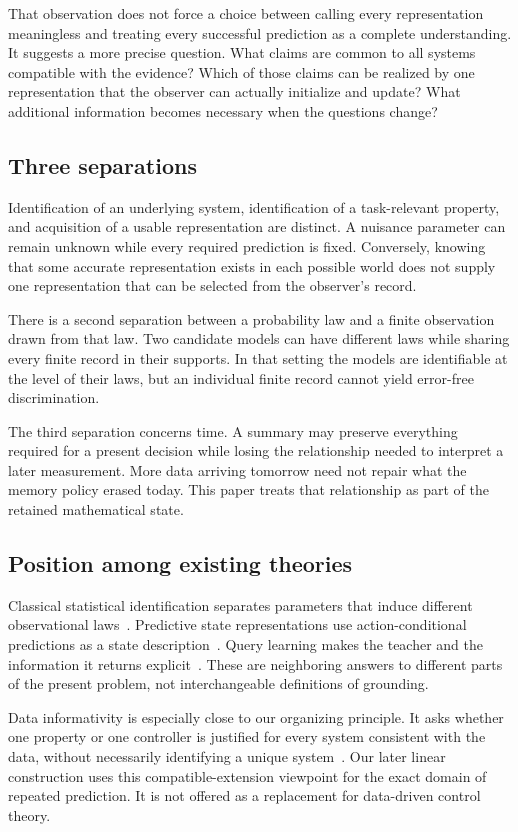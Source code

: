 \documentclass[11pt,letterpaper]{article}
\theoremstyle{plain}
\theoremstyle{definition}
\begin{document}
That observation does not force a choice between calling every representation meaningless and treating every successful prediction as a complete understanding. It suggests a more precise question. What claims are common to all systems compatible with the evidence? Which of those claims can be realized by one representation that the observer can actually initialize and update? What additional information becomes necessary when the questions change?

\subsection{Three separations}
Identification of an underlying system, identification of a task-relevant property, and acquisition of a usable representation are distinct. A nuisance parameter can remain unknown while every required prediction is fixed. Conversely, knowing that some accurate representation exists in each possible world does not supply one representation that can be selected from the observer's record.

There is a second separation between a probability law and a finite observation drawn from that law. Two candidate models can have different laws while sharing every finite record in their supports. In that setting the models are identifiable at the level of their laws, but an individual finite record cannot yield error-free discrimination.

The third separation concerns time. A summary may preserve everything required for a present decision while losing the relationship needed to interpret a later measurement. More data arriving tomorrow need not repair what the memory policy erased today. This paper treats that relationship as part of the retained mathematical state.

\subsection{Position among existing theories}
Classical statistical identification separates parameters that induce different observational laws~\cite{rothenberg}. Predictive state representations use action-conditional predictions as a state description~\cite{psr}. Query learning makes the teacher and the information it returns explicit~\cite{angluin}. These are neighboring answers to different parts of the present problem, not interchangeable definitions of grounding.

Data informativity is especially close to our organizing principle. It asks whether one property or one controller is justified for every system consistent with the data, without necessarily identifying a unique system~\cite{informativity}. Our later linear construction uses this compatible-extension viewpoint for the exact domain of repeated prediction. It is not offered as a replacement for data-driven control theory.
\end{document}
